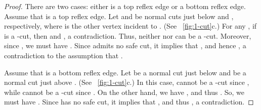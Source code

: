 \documentclass[11pt]{article}
\theoremstyle{definition}
\begin{document}
\begin{proof}
There are two cases: either  is a top reflex edge or a bottom reflex edge.
Assume that  is a top reflex edge.
Let  and  be normal cuts just below  and , respectively,
where  is the other vertex incident to .
(See \figurename~\ref{fig:1-cut}c.)
For any , if  is a -cut, then 
and , a contradiction.
Thus, neither  nor  can be a -cut.
Moreover, since ,
we must have .
Since  admits no safe cut, it implies that 
, and hence , a contradiction
to the assumption that .

Assume that  is a bottom reflex edge.
Let  be a normal cut just below 
and  be a normal cut just above .
(See \figurename~\ref{fig:1-cut}c.)
In this case,  cannot be a -cut since ,
while  cannot be a -cut since .
On the other hand, we have ,
and thus .
So, we must have .
Since  has no safe cut, it implies that  ,
and thus , a contradiction.
\end{proof}
\end{document}
